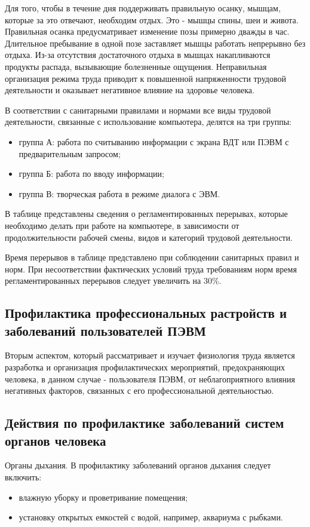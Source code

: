 Для того, чтобы в течение дня поддерживать  правильную осанку, мышцам, которые за это отвечают, необходим отдых. Это - мышцы спины, шеи и живота.                   Правильная осанка предусматривает изменение позы примерно дважды в час. Длительное пребывание в одной позе заставляет мышцы работать непрерывно без отдыха. Из-за отсутствия достаточного отдыха в мышцах накапливаются продукты распада, вызывающие болезненные ощущения. Неправильная организация режима труда приводит к повышенной напряженности трудовой деятельности и оказывает негативное влияние на здоровье человека.

В соответствии с санитарными правилами и нормами  все виды трудовой деятельности, связанные с использование компьютера, делятся на три группы:
\begin{itemize}
\item группа А: работа по считыванию информации с экрана ВДТ или ПЭВМ с предварительным запросом;
\item группа Б: работа по вводу информации;
\item группа В: творческая работа в режиме диалога с ЭВМ.
\end{itemize}

В таблице представлены сведения о регламентированных перерывах, которые необходимо делать при работе на компьютере, в зависимости от продолжительности рабочей смены, видов и категорий трудовой деятельности.

Время перерывов в таблице представлено при соблюдении санитарных правил и норм. При несоответствии фактических условий труда требованиям норм время регламентированных перерывов следует увеличить на 30\%.

\subsection{Профилактика профессиональных  растройств и заболеваний пользователей ПЭВМ}
Вторым аспектом, который рассматривает и изучает физиология труда является разработка и организация профилактических мероприятий, предохраняющих человека, в данном случае - пользователя ПЭВМ, от неблагоприятного влияния негативных факторов, связанных с его профессиональной деятельностью.

\subsection{Действия по профилактике заболеваний систем органов человека}
Органы дыхания. В профилактику заболеваний органов дыхания следует включить:
\begin{itemize}
\item влажную уборку и проветривание помещения;
\item установку открытых емкостей с водой, например, аквариума с рыбками.
\end{itemize}

